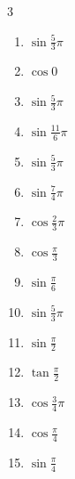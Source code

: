 \begin{multicols}{3}
\begin{enumerate}
  \item $\displaystyle \sin{\frac{5}{3}\pi}$

  \item $\displaystyle \cos{0}$
        \phantom{$\displaystyle =1$}

  \item $\displaystyle \sin{\frac{5}{3}\pi}$

  \item $\displaystyle \sin{\frac{11}{6}\pi}$

  \item $\displaystyle \sin{\frac{5}{3}\pi}$

  \item $\displaystyle \sin{\frac{7}{4}\pi}$

  \item $\displaystyle \cos{\frac{2}{3}\pi}$

  \item $\displaystyle \cos{\frac{\pi}{3}}$

  \item $\displaystyle \sin{\frac{\pi}{6}}$

  \item $\displaystyle \sin{\frac{5}{3}\pi}$

\columnbreak %

\resetques

  \item $\displaystyle \sin{\frac{\pi}{2}}$
        \phantom{$\displaystyle =1$}

  \item $\displaystyle \tan{\frac{\pi}{2}}$
        \phantom{$\displaystyle \quad なし$}

  \item $\displaystyle \cos{\frac{3}{4}\pi}$

  \item $\displaystyle \cos{\frac{\pi}{4}}$

  \item $\displaystyle \sin{\frac{\pi}{4}}$


\end{enumerate}
\end{multicols}
